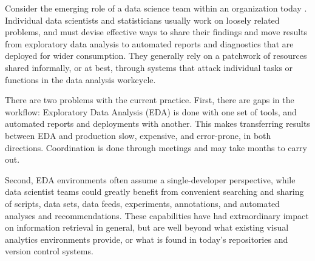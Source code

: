 
\maketitle





Consider the emerging role of a data science team within an
organization today \cite{Keim:2008:VAS}.
%
Individual data scientists and statisticians usually work on loosely
related problems, and must devise effective ways to share their findings
and move results from exploratory data analysis to automated reports and
diagnostics that are deployed for wider consumption.
They generally rely on a patchwork of resources shared informally,
or at best, through systems that attack individual tasks or functions
in the data analysis workcycle. %

There are two problems with the current practice. First, there are
gaps in the workflow: Exploratory Data Analysis (EDA) is done with one
set of tools, and automated reports and deployments with another. This
makes transferring results between EDA and production slow, expensive,
and error-prone, in both directions. Coordination is done through meetings
and may take months to carry out.

Second, EDA environments often assume a single-developer perspective,
while data scientist teams could greatly benefit from convenient searching
and sharing of scripts, data sets, data feeds, experiments, annotations,
and automated analyses and recommendations. These capabilities have had
extraordinary impact on information retrieval in general, but are well
beyond what existing visual analytics environments provide, or what
is found in today's repositories and version control
systems.\cite{Koren:2009:FIT}

